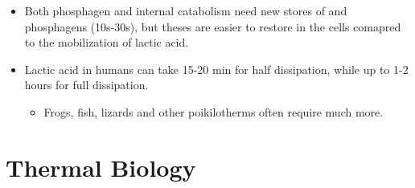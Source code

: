 \documentclass[12pt,a4paper]{article}
\begin{document}
\begin{itemize}
\begin{itemize}
\begin{itemize}
                \item Both phosphagen and internal catabolism need new stores of  and phosphagens (10s-30s), but theses are easier to restore in the cells comapred to the mobilization of lactic acid.
                \item Lactic acid in humans can take 15-20 min for half dissipation, while up to 1-2 hours for full dissipation.
                    \begin{itemize}
                        \item Frogs, fish, lizards and other poikilotherms often require much more.
                    \end{itemize}
            \end{itemize}
    \end{itemize}
\end{itemize}

\clearpage
\setcounter{section}{9}
\section{Thermal Biology}
\end{document}
